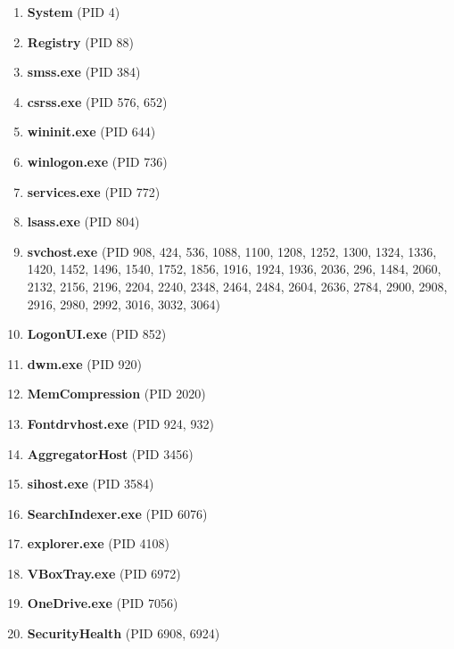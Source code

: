 \documentclass[12pt]{article}
\begin{document}
\begin{enumerate}
\item \textbf{System} (PID 4)

\item \textbf{Registry} (PID 88)

\item \textbf{smss.exe} (PID 384)

\item \textbf{csrss.exe} (PID 576, 652)

\item \textbf{wininit.exe} (PID 644)

\item \textbf{winlogon.exe} (PID 736)

\item \textbf{services.exe} (PID 772)

\item \textbf{lsass.exe} (PID 804)

\item \textbf{svchost.exe} (PID 908, 424, 536, 1088, 1100, 1208, 1252, 1300, 1324, 1336, 1420, 1452, 1496, 1540, 1752, 1856, 1916, 1924, 1936, 2036, 296, 1484, 2060, 2132, 2156, 2196, 2204, 2240, 2348, 2464, 2484, 2604, 2636, 2784, 2900, 2908, 2916, 2980, 2992, 3016, 3032, 3064)

\item \textbf{LogonUI.exe} (PID 852)

\item \textbf{dwm.exe} (PID 920)

\item \textbf{MemCompression} (PID 2020)

\item \textbf{Fontdrvhost.exe} (PID 924, 932)

\item \textbf{AggregatorHost} (PID 3456)

\item \textbf{sihost.exe} (PID 3584)

\item \textbf{SearchIndexer.exe} (PID 6076)

\item \textbf{explorer.exe} (PID 4108)

\item \textbf{VBoxTray.exe} (PID 6972)

\item \textbf{OneDrive.exe} (PID 7056)

\item \textbf{SecurityHealth} (PID 6908, 6924)


\end{enumerate}
\end{document}
